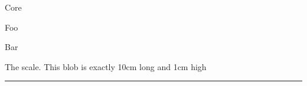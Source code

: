 \documentclass[print,Draft]{faosyb}
\begin{document}
\begin{metadata}{Core}
  \lipsum[1]
\end{metadata}

\begin{metadata}{Foo}
  \lipsum[1-12]
\end{metadata}

\begin{metadata}{Bar}
  \lipsum[12-24]
\end{metadata}



\newpage

\onecolumn


\clearpage


The scale.  This blob is exactly 10cm long and 1cm high

\rule{10cm}{1cm}
\end{document}
